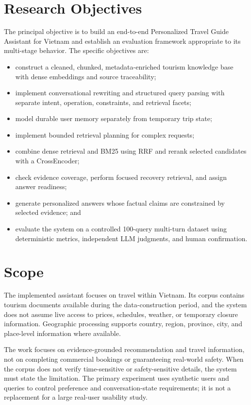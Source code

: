\section{Research Objectives}

The principal objective is to build an end-to-end Personalized Travel Guide
Assistant for Vietnam and establish an evaluation framework appropriate to its
multi-stage behavior. The specific objectives are:

\begin{itemize}
    \item construct a cleaned, chunked, metadata-enriched tourism knowledge
    base with dense embeddings and source traceability;
    \item implement conversational rewriting and structured query parsing with
    separate intent, operation, constraints, and retrieval facets;
    \item model durable user memory separately from temporary trip state;
    \item implement bounded retrieval planning for complex requests;
    \item combine dense retrieval and BM25 using RRF and rerank selected
    candidates with a CrossEncoder;
    \item check evidence coverage, perform focused recovery retrieval, and
    assign answer readiness;
    \item generate personalized answers whose factual claims are constrained by
    selected evidence; and
    \item evaluate the system on a controlled 100-query multi-turn dataset using
    deterministic metrics, independent LLM judgments, and human confirmation.
\end{itemize}

\section{Scope}

The implemented assistant focuses on travel within Vietnam. Its corpus contains
tourism documents available during the data-construction period, and the system
does not assume live access to prices, schedules, weather, or temporary closure
information. Geographic processing supports country, region, province, city,
and place-level information where available.

The work focuses on evidence-grounded recommendation and travel information,
not on completing commercial bookings or guaranteeing real-world safety. When
the corpus does not verify time-sensitive or safety-sensitive details, the
system must state the limitation. The primary experiment uses synthetic users
and queries to control preference and conversation-state requirements; it is not
a replacement for a large real-user usability study.

